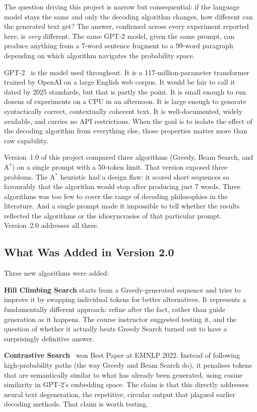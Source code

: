 \documentclass[12pt]{article}
\begin{document}
	The question driving this project is narrow but consequential: if the language model stays the same and only the decoding algorithm changes, how different can the generated text get? The answer, confirmed across every experiment reported here, is \emph{very} different. The same GPT-2 model, given the same prompt, can produce anything from a 7-word sentence fragment to a 99-word paragraph depending on which algorithm navigates the probability space.
	
	GPT-2~\cite{radford2019gpt2} is the model used throughout. It is a 117-million-parameter transformer trained by OpenAI on a large English web corpus. It would be fair to call it dated by 2025 standards, but that is partly the point. It is small enough to run dozens of experiments on a CPU in an afternoon. It is large enough to generate syntactically correct, contextually coherent text. It is well-documented, widely available, and carries no API restrictions. When the goal is to isolate the effect of the decoding algorithm from everything else, those properties matter more than raw capability.
	
	Version~1.0 of this project compared three algorithms (Greedy, Beam Search, and A$^*$) on a single prompt with a 50-token limit. That version exposed three problems. The A$^*$ heuristic had a design flaw: it scored short sequences so favourably that the algorithm would stop after producing just 7 words. Three algorithms was too few to cover the range of decoding philosophies in the literature. And a single prompt made it impossible to tell whether the results reflected the algorithms or the idiosyncrasies of that particular prompt. Version~2.0 addresses all three.
	
	\subsection{What Was Added in Version 2.0}
	
	Three new algorithms were added:
	
	\textbf{Hill Climbing Search} starts from a Greedy-generated sequence and tries to improve it by swapping individual tokens for better alternatives. It represents a fundamentally different approach: refine after the fact, rather than guide generation as it happens. The course instructor suggested testing it, and the question of whether it actually beats Greedy Search turned out to have a surprisingly definitive answer.
	
	\textbf{Contrastive Search}~\cite{su2022contrastive} won Best Paper at EMNLP 2022. Instead of following high-probability paths (the way Greedy and Beam Search do), it penalises tokens that are semantically similar to what has already been generated, using cosine similarity in GPT-2's embedding space. The claim is that this directly addresses neural text degeneration, the repetitive, circular output that plagued earlier decoding methods. That claim is worth testing.
	
\end{document}
